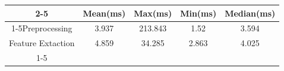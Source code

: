 \documentclass{standalone}
\begin{document}
 
 \begin{tabular}{|c |c |c |c |c |}
\cline{2-5}\cline{2-5} \multicolumn{1}{c |}{ } & Mean(ms) & Max(ms) & Min(ms) & Median(ms)\\ 
\cline{1-5}Preprocessing & 3.937 & 213.843 & 1.52 & 3.594\\ 
 \hhline{|=|=|=|=|=|}Feature Extaction & 4.859 & 34.285 & 2.863 & 4.025\\ 
 \cline{1-5}\hline \end{tabular}
 
\end{document}
